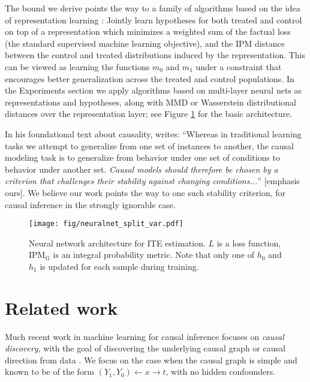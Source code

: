 \documentclass{article}
\def\cF{\mathrm{G}}
\begin{document}
The bound we derive points the way to a family of algorithms based on the idea of representation learning \cite{bengio2013representation}: Jointly learn  hypotheses for both treated and control on top of a representation which minimizes a weighted sum of the factual loss (the standard supervised machine learning objective), and the IPM distance between the control and treated distributions induced by the representation. This can be viewed as learning the functions $m_0$ and $m_1$ under a constraint that encourages better generalization across the treated and control populations.
In the Experiments section we apply algorithms based on multi-layer neural nets as representations and hypotheses, along with MMD or Wasserstein distributional distances over the representation layer; see Figure \ref{fig:neuralnet} for the basic architecture.





In his foundational text about causality, \citet{pearl2009causality} writes: ``Whereas in traditional learning tasks we attempt to generalize from one set of instances to another, the causal modeling task is to generalize from behavior under one set of conditions to behavior under another set. \emph{Causal models should therefore be chosen by a criterion that challenges their stability against changing conditions...}'' [emphasis ours]. We believe our work points the way to one such stability criterion, for causal inference in the strongly ignorable case.




\begin{figure}[t!]
  \centering
  \texttt{[image: fig/neuralnet\_split\_var.pdf]}
  \caption{\label{fig:neuralnet}Neural network architecture for ITE estimation. $L$ is a loss function, $\text{IPM}_\cF$ is an integral probability metric. Note that only one of $h_0$ and $h_1$ is updated for each sample during training. }
\end{figure}

\section{Related work}

Much recent work in machine learning for causal inference focuses on \emph{causal discovery}, with the goal of discovering the underlying causal graph or causal direction from data \citep{hoyer2009nonlinear,maathuis2010predicting,triantafillou2015constraint,mooij2016distinguishing}. We focus on the case when the causal graph is simple and known to be of the form $(Y_1,Y_0) \leftarrow x \rightarrow t$, with no hidden confounders.
\end{document}
